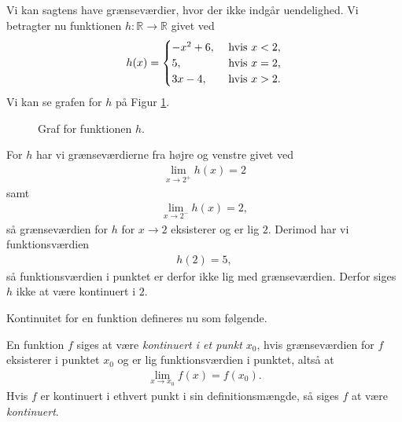 \begin{exa}
	Vi kan sagtens have grænseværdier, hvor der ikke indgår uendelighed. Vi betragter nu funktionen 
	$h:\mathbb{R} \to \mathbb{R}$ givet ved
	\begin{align*}
		h(x) = 
		\begin{cases}
		-x^2 + 6, \ &\textnormal{hvis } x < 2, \\
		5, &\textnormal{hvis } x = 2, \\
		3x - 4, &\textnormal{hvis } x > 2. 
		\end{cases}
	\end{align*}
	Vi kan se grafen for $h$ på Figur \ref{fig:grænse3}.
	\begin{figure}[H]
	\centering
	\caption{Graf for funktionen $h$.}
	\label{fig:grænse3}
	\end{figure}
	For $h$ har vi grænseværdierne fra højre og venstre givet ved 
	\begin{align*}
		\lim_{x \to 2^+} h(x) = 2
	\end{align*}
	samt 
	\begin{align*}
		\lim_{x \to 2^-}h(x) = 2,
	\end{align*}
	så grænseværdien for $h$ for $x \to 2$ eksisterer og er lig $2$. Derimod har vi funktionsværdien 
	\begin{align*}
		h(2) = 5, 
	\end{align*}
	så funktionsværdien i punktet er derfor ikke lig med grænseværdien. Derfor siges $h$ ikke at være 
	kontinuert i $2$. 
\end{exa}

Kontinuitet for en funktion defineres nu som følgende. 
\begin{defn}[Kontinuitet]
	En funktion $f$ siges at være \textit{kontinuert i et punkt $x_0$}, hvis grænseværdien for $f$ eksisterer i 
	punktet $x_0$ og er lig funktionsværdien i punktet, altså at
	\begin{align*}
		\lim_{x \to x_0} f(x) = f(x_0).
	\end{align*}	 
	Hvis $f$ er kontinuert i ethvert punkt i sin definitionsmængde, så siges $f$ at være \textit{kontinuert}.
\end{defn}

